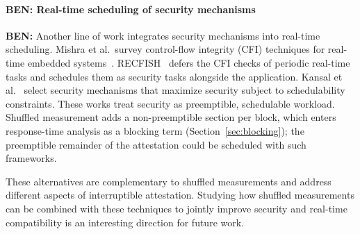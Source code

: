 \documentclass{ieeeaccess}
\DeclareRobustCommand{\ben}[1]{{\color{BENcolor}\textbf{BEN:} #1}}
\begin{document}
\paragraph{\ben{Real-time scheduling of security mechanisms}}
\ben{Another line of work integrates security mechanisms into real-time scheduling.
Mishra et al.\ survey control-flow integrity (CFI) techniques for real-time embedded systems~\cite{mishra2022survey}.
RECFISH~\cite{mishra2023procrastinating} defers the CFI checks of periodic real-time tasks and schedules them as security tasks alongside the application.
Kansal et al.~\cite{kansal2023integrated} select security mechanisms that maximize security subject to schedulability constraints.
These works treat security as preemptible, schedulable workload.
Shuffled measurement adds a non-preemptible section per block, which enters response-time analysis as a blocking term (Section~\ref{sec:blocking}); the preemptible remainder of the attestation could be scheduled with such frameworks.}

These alternatives are complementary to shuffled measurements and address different aspects of interruptible attestation.
Studying how shuffled measurements can be combined with these techniques to jointly improve security and real-time compatibility is an interesting direction for future work.
\end{document}
